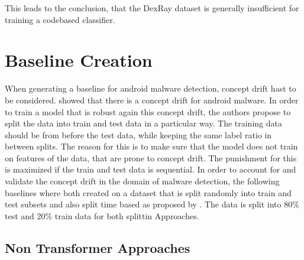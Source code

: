 This leads to the conclusion, that the DexRay dataset is generally insufficient for training a codebased classifier.


\section{Baseline Creation}

When generating a baseline for android malware detection, concept drift hast to be considered.
\cite{transcend} showed that there is a concept drift for android malware.
In order to train a model that is robust again this concept drift, 
the authors propose to split the data into train and test data in a particular way.
The training data should be from before the test data, 
while keeping the same label ratio in between splits.  
The reason for this is to make sure that the model does not train on features of the data, 
that are prone to concept drift.
The punishment for this is maximized if the train and test data is sequential.
In order to account for and validate the concept drift in the domain of malware detection,
the following baselines where both created on a dataset that is split randomly into train and test subsets
and also split time based as proposed by \cite{transcend}.
The data is split into 80\% test and 20\% train data for both splittin Approaches.

\subsection{Non Transformer Approaches}

